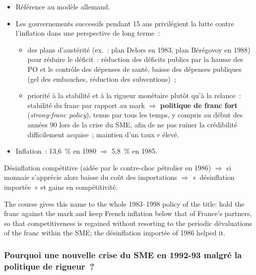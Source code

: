 \begin{itemize}
  \item Référence au modèle allemand.
  \item Les gouvernements successifs pendant 15 ans privilégient la lutte contre
    l'inflation dans une perspective de long terme~:
    \begin{itemize}
      \item des plans d'austérité (ex.~: plan Delors en 1983, plan Bérégovoy en 1988)
        pour réduire le déficit~: réduction des déficits publics par la hausse des PO et
        le contrôle des dépenses de santé, baisse des dépenses publiques (gel des
        embauches, réduction des subventions)~;
      \item priorité à la stabilité et à la rigueur monétaire plutôt qu'à la relance~:
        stabilité du franc par rapport au mark $\Rightarrow$ \textbf{politique de franc
        fort} (\textit{strong-franc policy}), tenue par tous les temps, y compris au
        début des années 90 lors de la crise du SME, afin de ne pas ruiner la
        crédibilité difficilement acquise~; maintien d'un taux $r$ élevé.
    \end{itemize}
  \item Inflation~: 13,6~\% en 1980 $\Rightarrow$ 5,8~\% en 1985.
\end{itemize}

\begin{definition}
  Désinflation compétitive (aidée par le contre-choc pétrolier en 1986) $\Rightarrow$ si
  monnaie s'apprécie alors baisse du coût des importations $\Rightarrow$ «~désinflation
  importée~» et gains en compétitivité.
\end{definition}

The course gives this name to the whole 1983--1998 policy of the title: hold the franc
against the mark and keep French inflation below that of France's partners, so that
competitiveness is regained without resorting to the periodic dévaluations of the franc
within the SME; the désinflation importée of 1986 helped it.

\subsubsection{Pourquoi une nouvelle crise du SME en 1992-93 malgré la politique de rigueur~?}

